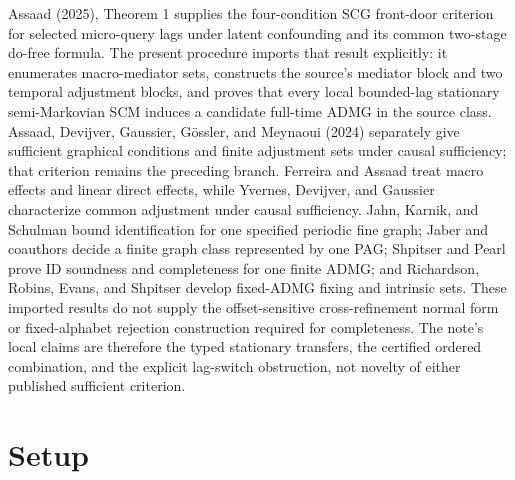 \documentclass{article}
\begin{document}
Assaad (2025), Theorem 1 supplies the four-condition SCG front-door criterion for selected micro-query lags under latent confounding and its common two-stage do-free formula. The present procedure imports that result explicitly: it enumerates macro-mediator sets, constructs the source's mediator block and two temporal adjustment blocks, and proves that every local bounded-lag stationary semi-Markovian SCM induces a candidate full-time ADMG in the source class. Assaad, Devijver, Gaussier, Gössler, and Meynaoui (2024) separately give sufficient graphical conditions and finite adjustment sets under causal sufficiency; that criterion remains the preceding branch. Ferreira and Assaad treat macro effects and linear direct effects, while Yvernes, Devijver, and Gaussier characterize common adjustment under causal sufficiency. Jahn, Karnik, and Schulman bound identification for one specified periodic fine graph; Jaber and coauthors decide a finite graph class represented by one PAG; Shpitser and Pearl prove ID soundness and completeness for one finite ADMG; and Richardson, Robins, Evans, and Shpitser develop fixed-ADMG fixing and intrinsic sets. These imported results do not supply the offset-sensitive cross-refinement normal form or fixed-alphabet rejection construction required for completeness. The note's local claims are therefore the typed stationary transfers, the certified ordered combination, and the explicit lag-switch obstruction, not novelty of either published sufficient criterion.

\section{Setup}
\end{document}
